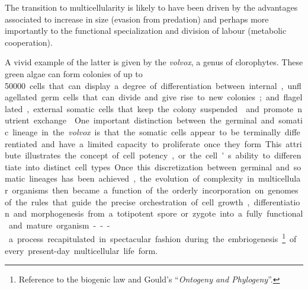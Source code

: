 \documentclass{tufte-book}
\begin{document}
The transition to multicellularity is likely to have been driven by the
advantages associated to increase in size (evasion from predation) and perhaps
more importantly to the functional specialization and division of labour
(metabolic cooperation).

A vivid example of the latter is given by the \emph{volvox}, a genus of
clorophytes.  These green algae can form colonies of up to \SI{50000} cells that
can display a degree of differentiation between internal, unflagellated germ
cells that can divide and give rise to new colonies; and flagellated, external
somatic cells that keep the colony suspended\cite{kirk_volvox:_2005} and promote
nutrient exchange.\cite{solari_multicellularity_2006}

One important distinction between the germinal and somatic lineage in the
\emph{volvox} is that the somatic cells appear to be terminally differentiated
and have a limited capacity to proliferate once they form.  This attribute
illustrates the concept of cell potency, or the cell's ability to differentiate
into distinct cell types.

Once this discretization between germinal and somatic lineages has been
achieved, the evolution of complexity in multicellular organisms then became a
function of the orderly incorporation on genomes of the rules that guide the
precise orchestration of cell growth, differentiation and morphogenesis from a
totipotent spore or zygote into a fully functional and mature organism---a
process recapitulated in spectacular fashion during the
embriogenesis\footnote{ Reference to the biogenic law and
  Gould's ``\emph{Ontogeny and Phylogeny}''.}  of every \mbox{present-day}
multicellular life form.





\end{document}
